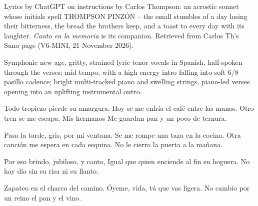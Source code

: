 \begin{notes}
Lyrics by ChatGPT on instructions by Carlos Thompson: an acrostic sonnet whose initials spell THOMPSON PINZÓN -- the small stumbles of a day losing their bitterness, the bread the brothers keep, and a toast to every day with its laughter. \emph{Canto en la memoria} is its companion. Retrieved from Carlos Th's Suno page (V6-MINI, 21 November 2026).
\end{notes}
\begin{style}
Symphonic new age, gritty, strained lyric tenor vocals in Spanish, half-spoken through the verses; mid-tempo, with a high energy intro falling into soft 6/8 pasillo cadence; bright multi-tracked piano and swelling strings, piano-led verses opening into an uplifting instrumental outro.
\end{style}
\begin{lyrics}
Todo tropiezo pierde su amargura.
Hoy se me enfría el café entre las manos.
Otro tren se me escapa. Mis hermanos
Me guardan pan y un poco de ternura.

Pasa la tarde, gris, por mi ventana.
Se me rompe una taza en la cocina.
Otra canción me espera en cada esquina.
No le cierro la puerta a la mañana.

Por eso brindo, jubiloso, y canto,
Igual que quien enciende al fin su hoguera.
No hay día sin su risa ni su llanto.

Zapateo en el charco del camino.
Óyeme, vida, tú que vas ligera.
No cambio por un reino el pan y el vino.
\end{lyrics}

